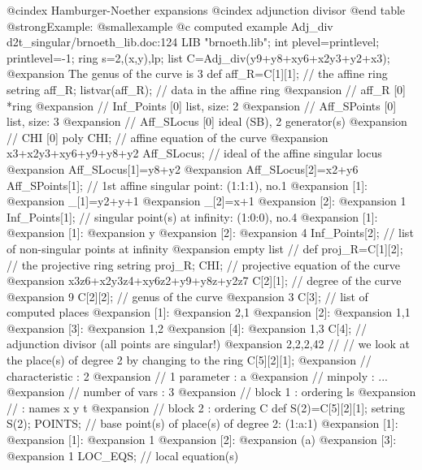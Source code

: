 @cindex Hamburger-Noether expansions
@cindex adjunction divisor
@end table
@strong{Example:}
@smallexample
@c computed example Adj_div d2t_singular/brnoeth_lib.doc:124 
LIB "brnoeth.lib";
int plevel=printlevel;
printlevel=-1;
ring s=2,(x,y),lp;
list C=Adj_div(y9+y8+xy6+x2y3+y2+x3);
@expansion{} The genus of the curve is 3
def aff_R=C[1][1];      // the affine ring
setring aff_R;
listvar(aff_R);         // data in the affine ring
@expansion{} // aff_R                [0]  *ring
@expansion{} // Inf_Points           [0]  list, size: 2
@expansion{} // Aff_SPoints          [0]  list, size: 3
@expansion{} // Aff_SLocus           [0]  ideal (SB), 2 generator(s)
@expansion{} // CHI                  [0]  poly
CHI;                    // affine equation of the curve
@expansion{} x3+x2y3+xy6+y9+y8+y2
Aff_SLocus;             // ideal of the affine singular locus
@expansion{} Aff_SLocus[1]=y8+y2
@expansion{} Aff_SLocus[2]=x2+y6
Aff_SPoints[1];         // 1st affine singular point: (1:1:1), no.1
@expansion{} [1]:
@expansion{}    _[1]=y2+y+1
@expansion{}    _[2]=x+1
@expansion{} [2]:
@expansion{}    1
Inf_Points[1];          // singular point(s) at infinity: (1:0:0), no.4
@expansion{} [1]:
@expansion{}    [1]:
@expansion{}       y
@expansion{}    [2]:
@expansion{}       4
Inf_Points[2];          // list of non-singular points at infinity
@expansion{} empty list
//
def proj_R=C[1][2];     // the projective ring
setring proj_R;
CHI;                    // projective equation of the curve
@expansion{} x3z6+x2y3z4+xy6z2+y9+y8z+y2z7
C[2][1];                // degree of the curve
@expansion{} 9
C[2][2];                // genus of the curve
@expansion{} 3
C[3];                   // list of computed places
@expansion{} [1]:
@expansion{}    2,1
@expansion{} [2]:
@expansion{}    1,1
@expansion{} [3]:
@expansion{}    1,2
@expansion{} [4]:
@expansion{}    1,3
C[4];                   // adjunction divisor (all points are singular!)
@expansion{} 2,2,2,42
//
// we look at the place(s) of degree 2 by changing to the ring
C[5][2][1];
@expansion{} //   characteristic : 2
@expansion{} //   1 parameter    : a 
@expansion{} //   minpoly        : ...
@expansion{} //   number of vars : 3
@expansion{} //        block   1 : ordering ls
@expansion{} //                  : names    x y t 
@expansion{} //        block   2 : ordering C
def S(2)=C[5][2][1];
setring S(2);
POINTS;                // base point(s) of place(s) of degree 2: (1:a:1)
@expansion{} [1]:
@expansion{}    [1]:
@expansion{}       1
@expansion{}    [2]:
@expansion{}       (a)
@expansion{}    [3]:
@expansion{}       1
LOC_EQS;               // local equation(s)
